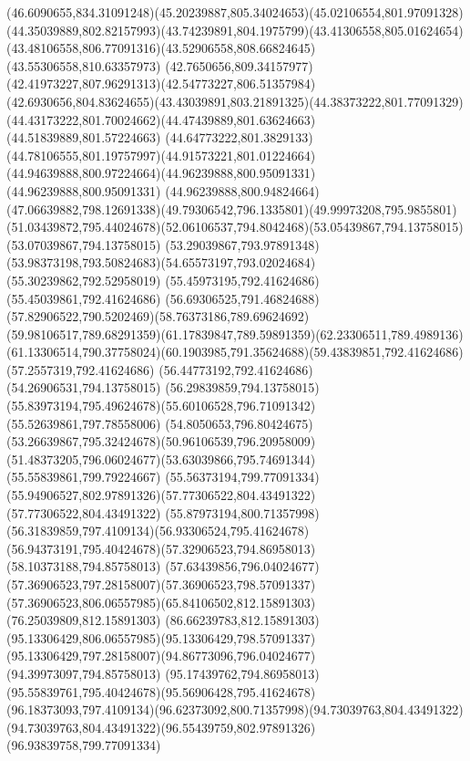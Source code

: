 {{\curveto(46.6090655,834.31091248)(45.20239887,805.34024653)(45.02106554,801.97091328)
\curveto(44.35039889,802.82157993)(43.74239891,804.1975799)(43.41306558,805.01624654)
\curveto(43.48106558,806.77091316)(43.52906558,808.66824645)(43.55306558,810.63357973)
\curveto(42.7650656,809.34157977)(42.41973227,807.96291313)(42.54773227,806.51357984)
\curveto(42.6930656,804.83624655)(43.43039891,803.21891325)(44.38373222,801.77091329)
\curveto(44.43173222,801.70024662)(44.47439889,801.63624663)(44.51839889,801.57224663)
\curveto(44.64773222,801.3829133)(44.78106555,801.19757997)(44.91573221,801.01224664)
\curveto(44.94639888,800.97224664)(44.96239888,800.95091331)(44.96239888,800.95091331)
\lineto(44.96239888,800.94824664)
\curveto(47.06639882,798.12691338)(49.79306542,796.1335801)(49.99973208,795.9855801)
\curveto(51.03439872,795.44024678)(52.06106537,794.8042468)(53.05439867,794.13758015)
\lineto(53.07039867,794.13758015)
\lineto(53.29039867,793.97891348)
\curveto(53.98373198,793.50824683)(54.65573197,793.02024684)(55.30239862,792.52958019)
\lineto(55.45973195,792.41624686)
\lineto(55.45039861,792.41624686)
\curveto(56.69306525,791.46824688)(57.82906522,790.5202469)(58.76373186,789.69624692)
\curveto(59.98106517,789.68291359)(61.17839847,789.59891359)(62.23306511,789.4989136)
\curveto(61.13306514,790.37758024)(60.1903985,791.35624688)(59.43839851,792.41624686)
\lineto(57.2557319,792.41624686)
\lineto(56.44773192,792.41624686)
\lineto(54.26906531,794.13758015)
\lineto(56.29839859,794.13758015)
\curveto(55.83973194,795.49624678)(55.60106528,796.71091342)(55.52639861,797.78558006)
\curveto(54.8050653,796.80424675)(53.26639867,795.32424678)(50.96106539,796.20958009)
\curveto(51.48373205,796.06024677)(53.63039866,795.74691344)(55.55839861,799.79224667)
\lineto(55.56373194,799.77091334)
\curveto(55.94906527,802.97891326)(57.77306522,804.43491322)(57.77306522,804.43491322)
\curveto(55.87973194,800.71357998)(56.31839859,797.4109134)(56.93306524,795.41624678)
\curveto(56.94373191,795.40424678)(57.32906523,794.86958013)(58.10373188,794.85758013)
\curveto(57.63439856,796.04024677)(57.36906523,797.28158007)(57.36906523,798.57091337)
\curveto(57.36906523,806.06557985)(65.84106502,812.15891303)(76.25039809,812.15891303)
\curveto(86.66239783,812.15891303)(95.13306429,806.06557985)(95.13306429,798.57091337)
\curveto(95.13306429,797.28158007)(94.86773096,796.04024677)(94.39973097,794.85758013)
\curveto(95.17439762,794.86958013)(95.55839761,795.40424678)(95.56906428,795.41624678)
\curveto(96.18373093,797.4109134)(96.62373092,800.71357998)(94.73039763,804.43491322)
\curveto(94.73039763,804.43491322)(96.55439759,802.97891326)(96.93839758,799.77091334)
}}
